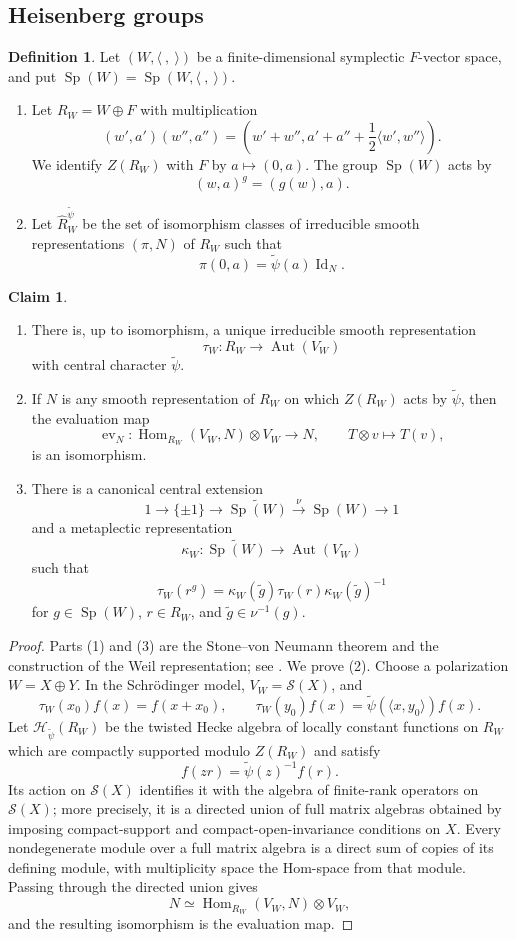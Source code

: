 \documentclass[11pt,a4paper,twoside]{amsart}
\theoremstyle{definition}
\newtheorem{definition}[theorem]{Definition}
\newtheorem{claim}[theorem]{Claim}
\theoremstyle{remark}
\newcommand{\kk}{\kappa}
\newcommand{\mcH}{\mathcal H}
\newcommand{\mcS}{\mathcal S}
\newcommand{\Aut}{\operatorname{Aut}}
\newcommand{\Sp}{\operatorname{Sp}}
\newcommand{\Id}{\operatorname{Id}}
\newcommand{\Hom}{\operatorname{Hom}}
\begin{document}
\subsection{Heisenberg groups}
\begin{definition}\label{dh}
Let $(W,\langle\ ,\ \rangle)$ be a finite-dimensional symplectic $F$-vector space, and put $\Sp(W)=\Sp(W,\langle\ ,\ \rangle)$.
\begin{enumerate}
\item Let $R_W=W\oplus F$ with multiplication
$$
(w',a')(w'',a'')=\left(w'+w'',a'+a''+\frac12\langle w',w''\rangle\right).
$$
We identify $Z(R_W)$ with $F$ by $a\mapsto(0,a)$. The group $\Sp(W)$ acts by
$$
(w,a)^g=(g(w),a).
$$
\item Let $\widehat R_W^{\widetilde\psi}$ be the set of isomorphism classes of irreducible smooth representations $(\pi,N)$ of $R_W$ such that
$$
\pi(0,a)=\widetilde\psi(a)\Id_N.
$$
\end{enumerate}
\end{definition}
\begin{claim}\label{hei}
\begin{enumerate}
\item There is, up to isomorphism, a unique irreducible smooth representation
$$
\tau_W:R_W\longrightarrow\Aut(V_W)
$$
with central character $\widetilde\psi$.
\item If $N$ is any smooth representation of $R_W$ on which $Z(R_W)$ acts by $\widetilde\psi$, then the evaluation map
$$
\operatorname{ev}_N:\Hom_{R_W}(V_W,N)\otimes V_W\longrightarrow N,
\qquad T\otimes v\longmapsto T(v),
$$
is an isomorphism.
\item There is a canonical central extension
$$
1\longrightarrow\{\pm1\}\longrightarrow\widetilde{\Sp(W)}\stackrel{\nu}{\longrightarrow}\Sp(W)\longrightarrow1
$$
and a metaplectic representation
$$
\kk_W:\widetilde{\Sp(W)}\longrightarrow\Aut(V_W)
$$
such that
$$
\tau_W(r^g)=\kk_W(\widetilde g)\tau_W(r)\kk_W(\widetilde g)^{-1}
$$
for $g\in\Sp(W)$, $r\in R_W$, and $\widetilde g\in\nu^{-1}(g)$.
\end{enumerate}
\end{claim}
\begin{proof}
Parts (1) and (3) are the Stone--von Neumann theorem and the construction of the Weil representation; see \cite{W}. We prove (2). Choose a polarization $W=X\oplus Y$. In the Schrödinger model, $V_W=\mcS(X)$, and
$$
\tau_W(x_0)f(x)=f(x+x_0),\qquad
\tau_W(y_0)f(x)=\widetilde\psi(\langle x,y_0\rangle)f(x).
$$
Let $\mcH_{\widetilde\psi}(R_W)$ be the twisted Hecke algebra of locally constant functions on $R_W$ which are compactly supported modulo $Z(R_W)$ and satisfy
$$
f(zr)=\widetilde\psi(z)^{-1}f(r).
$$
Its action on $\mcS(X)$ identifies it with the algebra of finite-rank operators on $\mcS(X)$; more precisely, it is a directed union of full matrix algebras obtained by imposing compact-support and compact-open-invariance conditions on $X$. Every nondegenerate module over a full matrix algebra is a direct sum of copies of its defining module, with multiplicity space the Hom-space from that module. Passing through the directed union gives
$$
N\simeq\Hom_{R_W}(V_W,N)\otimes V_W,
$$
and the resulting isomorphism is the evaluation map.
\end{proof}
\end{document}
